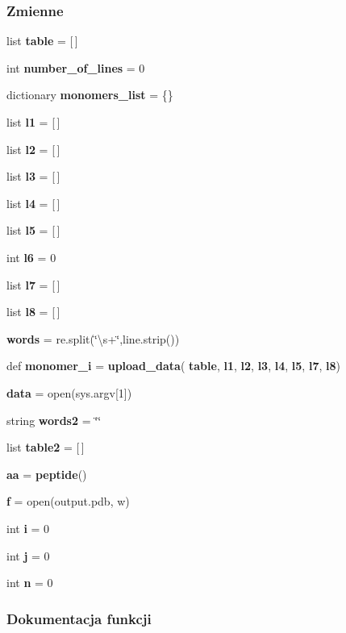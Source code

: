 \subsubsection*{Zmienne}
\begin{DoxyCompactItemize}
\item 
list \textbf{ table} = [$\,$]
\item 
int \textbf{ number\+\_\+of\+\_\+lines} = 0
\item 
dictionary \textbf{ monomers\+\_\+list} = \{\}
\item 
list \textbf{ l1} = [$\,$]
\item 
list \textbf{ l2} = [$\,$]
\item 
list \textbf{ l3} = [$\,$]
\item 
list \textbf{ l4} = [$\,$]
\item 
list \textbf{ l5} = [$\,$]
\item 
int \textbf{ l6} = 0
\item 
list \textbf{ l7} = [$\,$]
\item 
list \textbf{ l8} = [$\,$]
\item 
\textbf{ words} = re.\+split(\char`\"{}\textbackslash{}s+\char`\"{},line.\+strip())
\item 
def \textbf{ monomer\+\_\+i} = \textbf{ upload\+\_\+data}(\textbf{ table}, \textbf{ l1}, \textbf{ l2}, \textbf{ l3}, \textbf{ l4}, \textbf{ l5}, \textbf{ l7}, \textbf{ l8})
\item 
\textbf{ data} = open(sys.\+argv[1])
\item 
string \textbf{ words2} = \char`\"{}\char`\"{}
\item 
list \textbf{ table2} = [$\,$]
\item 
\textbf{ aa} = \textbf{ peptide}()
\item 
\textbf{ f} = open(\textquotesingle{}output.\+pdb\textquotesingle{}, \textquotesingle{}w\textquotesingle{})
\item 
int \textbf{ i} = 0
\item 
int \textbf{ j} = 0
\item 
int \textbf{ n} = 0
\end{DoxyCompactItemize}


\subsubsection{Dokumentacja funkcji}
\mbox{\label{namespaceprogram_a1a5eb7e0796234b56f3f8aaf1d224e91}} 
